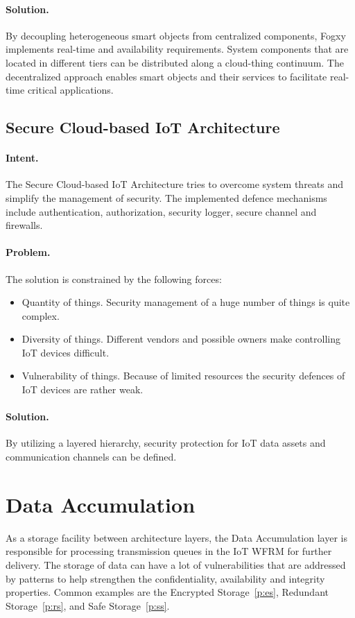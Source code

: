 \paragraph{\textbf{Solution.}} By decoupling heterogeneous smart objects from centralized components, Fogxy implements real-time and availability requirements. System components that are located in different tiers can be distributed along a cloud-thing continuum. The decentralized approach enables smart objects and their services to facilitate real-time critical applications. 


\subsection{Secure Cloud-based IoT Architecture~\cite{Fernandez20203}} 
\label{p:cloud}

\paragraph{\textbf{Intent.}} The Secure Cloud-based IoT Architecture tries to overcome system threats and simplify the management of security. The implemented defence mechanisms include authentication, authorization, security logger, secure channel and firewalls.

\paragraph{\textbf{Problem.}} The solution is constrained by the following forces:
\begin{itemize}
	\item Quantity of things. Security management of a huge number of things is quite complex.
	\item Diversity of things. Different vendors and possible owners make controlling IoT devices difficult.
	\item Vulnerability of things. Because of limited resources the security defences of IoT devices are rather weak.
\end{itemize}

\paragraph{\textbf{Solution.}} By utilizing a layered hierarchy, security protection for IoT data assets and communication channels can be defined.


\section{Data Accumulation}\label{L4}
As a storage facility between architecture layers, the Data Accumulation layer is responsible for processing transmission queues in the IoT WFRM for further delivery. The storage of data can have a lot of vulnerabilities that are addressed by patterns to help strengthen the confidentiality, availability and integrity properties. Common examples are the Encrypted Storage~\ref{p:es}, Redundant Storage~\ref{p:rs}, and Safe Storage~\ref{p:ss}.


